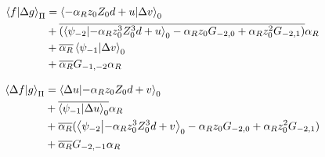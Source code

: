 \begin{align*}
\ip{f}{\Delta g}_\Pi
&= \ip{- \alpha_R z_0 Z_0 d + u}{\Delta v}_0 \\
&+ \cconj{(\ip{\psi_{-2}}{- \alpha_R z_0^3 Z_0^3 d + u}_0 - \alpha_R z_0 G_{-2, 0} + \alpha_R z_0^2 G_{-2, 1})} \alpha_R \\
&+ \cconj{\alpha_R} \ip{\psi_{-1}}{\Delta v}_0 \\
&+ \cconj{\alpha_R} G_{-1, -2} \alpha_R
\end{align*}

\begin{align*}
\ip{\Delta f}{g}_\Pi
&= \ip{\Delta u}{- \alpha_R z_0 Z_0 d + v}_0 \\
&+ \cconj{\ip{\psi_{-1}}{\Delta u}_0} \alpha_R \\
&+ \cconj{\alpha_R} (\ip{\psi_{-2}}{- \alpha_R z_0^3 Z_0^3 d + v}_0 - \alpha_R z_0 G_{-2, 0} + \alpha_R z_0^2 G_{-2, 1})\\
&+ \cconj{\alpha_R} G_{-2, -1} \alpha_R
\end{align*}